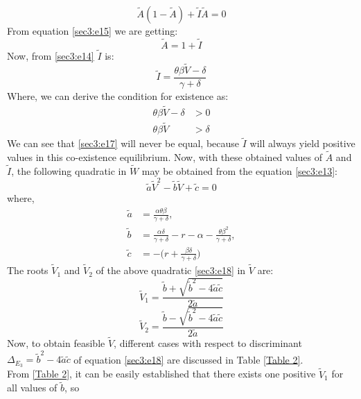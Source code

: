 \documentclass[12pt]{article}
\numberwithin{equation}{section}
\begin{document}
\begin{enumerate}[i)]
\begin{equation}\label{sec3:e15}
\tilde A(1- \tilde A)+\tilde I \tilde A=0
\end{equation}
From equation \eqref{sec3:e15} we are getting:
\begin{equation}\label{sec3:e16}
\tilde A=1+\tilde I
\end{equation}
Now, from \eqref{sec3:e14} $\tilde I$ is:
\begin{equation}\label{sec3:e16}
\tilde I = \frac{\theta \beta \tilde V-\delta}{\gamma +\delta}
\end{equation}
Where, we can derive the condition for existence as:
\begin{align}\label{sec3:e17}
\theta \beta \tilde V-\delta &>0\\
\theta \beta \tilde V &>\delta
\end{align}
We can see that \eqref{sec3:e17} will never be equal, because $\tilde I$ will always yield positive values in this co-existence equilibrium.
Now, with these obtained values of $\tilde A$ and $\tilde I$, the following quadratic in $\tilde W$ may be obtained from the equation \eqref{sec3:e13}:
\begin{equation}\label{sec3:e18}
\tilde a \tilde V^2 - \tilde b \tilde V + \tilde  c =0
\end{equation}
where,
\begin{align}\label{sec3:e19}
\tilde a &= \frac{\alpha \theta \beta}{\gamma +\delta},\\
\tilde b &= \frac{\alpha \delta}{\gamma + \delta} -r-\alpha -\frac{\theta \beta^2}{\gamma + \delta},\\
\tilde c &= -\bigg( r+\frac{\beta \delta}{\gamma + \delta}\bigg)
\end{align}
The roots $\tilde V_1$ and $\tilde V_2$ of the above quadratic \eqref{sec3:e18} in $\tilde V$ are:
\begin{equation}\label{sec3:e20}
\tilde V_1 = \frac{\tilde b + \sqrt{\tilde b^2 - 4\tilde a \tilde c}}{2 \tilde a}
\end{equation}
\begin{equation}\label{sec3:e21}
\tilde V_2 = \frac{\tilde b - \sqrt{\tilde b^2 - 4\tilde a \tilde c}}{2 \tilde a}
\end{equation}
  Now, to obtain feasible $\tilde V$, different cases with respect to discriminant $\Delta_{E_3}=\tilde b^{2}-4\tilde a \tilde c$ of equation \eqref{sec3:e18} are discussed in Table \ref{Table 2}. \\
From \ref{Table 2}, it can be easily established that there exists one positive $\tilde V_1$ for all values of $\tilde b$, so\\

\end{enumerate}
\end{document}
